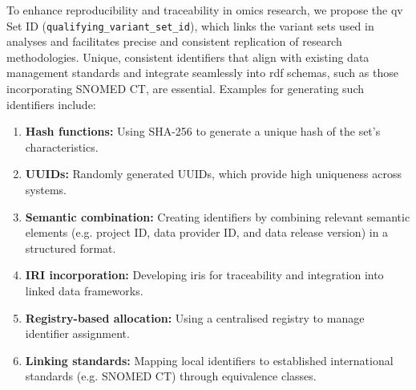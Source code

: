 To enhance reproducibility and traceability in omics research, we propose the \ac{qv} Set ID (\texttt{qualifying\_variant\_set\_id}), which links the variant sets used in analyses and facilitates precise and consistent replication of research methodologies. Unique, consistent identifiers that align with existing data management standards and integrate seamlessly into \ac{rdf} schemas, such as those incorporating SNOMED CT, are essential. Examples for generating such identifiers include:
\begin{enumerate}
    \item \textbf{Hash functions:} Using SHA-256 to generate a unique hash of the set's characteristics.
    \item \textbf{UUIDs:} Randomly generated UUIDs, which provide high uniqueness across systems.
    \item \textbf{Semantic combination:} Creating identifiers by combining relevant semantic elements (e.g. project ID, data provider ID, and data release version) in a structured format.
    \item \textbf{IRI incorporation:} Developing \ac{iri}s for traceability and integration into linked data frameworks.
    \item \textbf{Registry-based allocation:} Using a centralised registry to manage identifier assignment.
    \item \textbf{Linking standards:} Mapping local identifiers to established international standards (e.g. SNOMED CT) through equivalence classes.
\end{enumerate}


